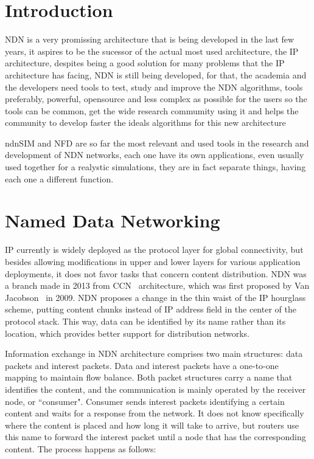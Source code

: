 \documentclass[11pt,conference]{./IEEEtran}
\begin{document}
	\section{Introduction}

	NDN is a very promissing architecture that is being developed in the last few years, it aspires to be the sucessor of the actual most used architecture, the IP architecture, despites being a good solution for many problems that the IP architecture has facing, NDN is still being developed, for that, the academia and the developers need tools to test, study and improve the NDN algorithms, tools preferably, powerful, opensource and less complex as possible for the users so the tools can be common, get the wide research commumity using it and helps the community to develop faster the ideals algorithms for this new architecture \par
	ndnSIM and NFD are so far the most relevant and used tools in the research and development of NDN networks, each one have its own applications, even usually used together for a realystic simulations, they are in fact separate things, having each one a different function.



	\section{Named Data Networking}  \label{sec:ndn}

	IP currently is widely deployed as the protocol layer for global connectivity, but besides allowing modifications in upper and lower layers for various application deployments, it does not favor tasks that concern content distribution. NDN was a branch made in 2013 from CCN~\cite{ccn} architecture, which was first proposed by Van Jacobson~\cite{Jacobson09} in 2009. NDN proposes a change in the thin waist of the IP hourglass scheme, putting content chunks instead of IP address field in the center of the protocol stack. This way, data can be identified by its name rather than its location, which provides better support for distribution networks. 

	Information exchange in NDN architecture comprises two main structures: data packets and interest packets. Data and interest packets have a one-to-one mapping to maintain flow balance. Both packet structures carry a name that identifies the content, and the communication is mainly operated by the receiver node, or ``consumer". Consumer sends interest packets identifying a certain content and waits for a response from the network. It does not know specifically where the content is placed and how long it will take to arrive, but routers use this name to forward the interest packet until a node that has the corresponding content. The process happens as follows:
\end{document}
